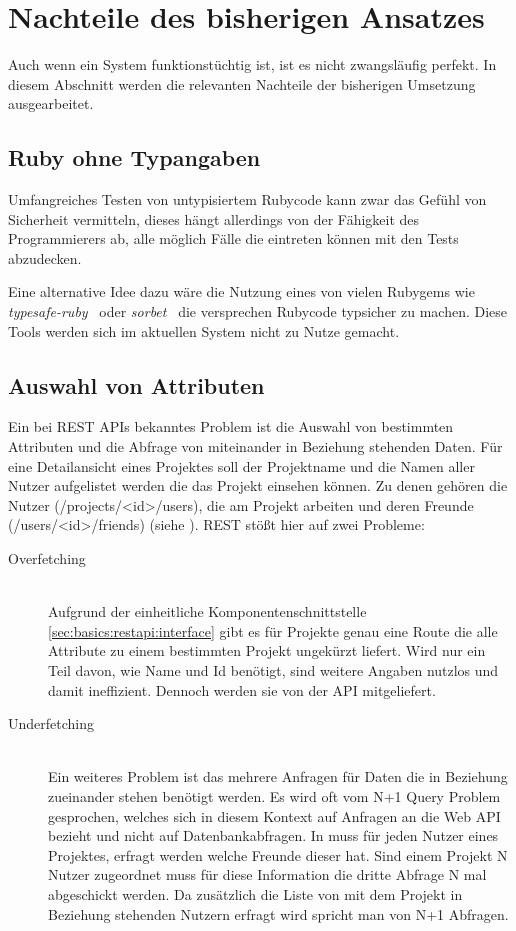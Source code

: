 \section{Nachteile des bisherigen Ansatzes}
Auch wenn ein System funktionstüchtig ist, ist es nicht zwangsläufig perfekt.
In diesem Abschnitt werden die relevanten Nachteile der bisherigen Umsetzung ausgearbeitet.

\subsection{Ruby ohne Typangaben}
Umfangreiches Testen von untypisiertem Rubycode kann zwar das Gefühl von Sicherheit vermitteln, dieses hängt allerdings von der Fähigkeit des Programmierers ab, alle möglich Fälle die eintreten können mit den Tests abzudecken.

Eine alternative Idee dazu wäre die Nutzung eines von vielen Rubygems wie \emph{typesafe-ruby}~\cite{typesafe-ruby}
oder \emph{sorbet}~\cite{sorbet} die versprechen Rubycode typsicher zu machen. Diese Tools werden sich im aktuellen System nicht zu Nutze gemacht.

\subsection{Auswahl von Attributen}
\label{sec:requirements:cons:attributes}
Ein bei REST APIs bekanntes Problem ist die Auswahl von bestimmten Attributen und die Abfrage von miteinander in Beziehung stehenden Daten.
Für eine Detailansicht eines Projektes soll der Projektname und die Namen aller Nutzer aufgelistet werden die das Projekt einsehen können.
Zu denen gehören die Nutzer (/projects/<id>/users), die am Projekt arbeiten und deren Freunde (/users/<id>/friends) (siehe ).
REST stößt hier auf zwei Probleme:

\begin{description}
    \item[Overfetching\label{cons:overfetching}] \ \\
    Aufgrund der einheitliche Komponentenschnittstelle \ref{sec:basics:restapi:interface} gibt es für Projekte genau eine Route die alle Attribute zu einem bestimmten
    Projekt ungekürzt liefert. Wird nur ein Teil davon, wie Name und Id benötigt, sind weitere Angaben nutzlos und damit ineffizient.
    Dennoch werden sie von der API mitgeliefert.
    \item[Underfetching\label{cons:underfetching}] \ \\
    Ein weiteres Problem ist das mehrere Anfragen für Daten die in Beziehung zueinander stehen benötigt werden. Es wird oft vom N+1 Query Problem gesprochen, welches sich in diesem Kontext auf Anfragen an die Web API bezieht und nicht auf Datenbankabfragen.
    In  muss für jeden Nutzer eines Projektes, erfragt werden welche Freunde dieser hat.
    Sind einem Projekt N Nutzer zugeordnet muss für diese Information die dritte Abfrage N mal abgeschickt werden. Da zusätzlich die Liste von mit dem Projekt in Beziehung stehenden Nutzern erfragt wird spricht man von N+1 Abfragen.
\end{description}


